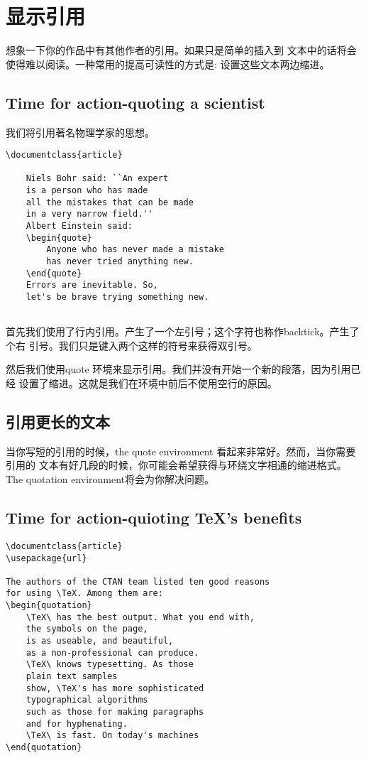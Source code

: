 \section{显示引用}
想象一下你的作品中有其他作者的引用。如果只是简单的插入到
文本中的话将会使得难以阅读。一种常用的提高可读性的方式是:
设置这些文本两边缩进。
	\subsection{Time for action-quoting a scientist}
	我们将引用著名物理学家的思想。
	\begin{lstlisting}[language={[LaTeX]TeX}]
	\documentclass{article}
	
	Niels Bohr said: ``An expert
	is a person who has made
	all the mistakes that can be made
	in a very narrow field.''
	Albert Einstein said:
	\begin{quote}
		Anyone who has never made a mistake
		has never tried anything new.
	\end{quote}
	Errors are inevitable. So,
	let's be brave trying something new.
	
	\end{lstlisting}
首先我们使用了行内引用。产生了一个左引号；这个字符也称作backtick。产生了个右
引号。我们只是键入两个这样的符号来获得双引号。

然后我们使用quote 环境来显示引用。我们并没有开始一个新的段落，因为引用已经
设置了缩进。这就是我们在环境中前后不使用空行的原因。
	\subsection{引用更长的文本}
当你写短的引用的时候，the quote environment 看起来非常好。然而，当你需要引用的
文本有好几段的时候，你可能会希望获得与环绕文字相通的缩进格式。The quotation
environment将会为你解决问题。
	\subsection{Time for action-quioting TeX's benefits}
\begin{lstlisting}[language={[LaTeX]TeX}]
\documentclass{article}
\usepackage{url}

The authors of the CTAN team listed ten good reasons
for using \TeX. Among them are:
\begin{quotation}
	\TeX\ has the best output. What you end with,
	the symbols on the page,
	is as useable, and beautiful,
	as a non-professional can produce.
	\TeX\ knows typesetting. As those
	plain text samples
	show, \TeX's has more sophisticated
	typographical algorithms
	such as those for making paragraphs
	and for hyphenating.
	\TeX\ is fast. On today's machines
\end{quotation}

\end{lstlisting}

